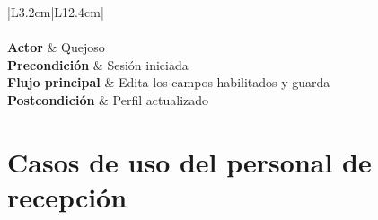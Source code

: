 \begingroup
{}
\small
\renewcommand{\arraystretch}{1.25}
\setlength{\tabcolsep}{4pt}
\begin{longtable}{|L{3.2cm}|L{12.4cm}|}
	\hline
	 \\
	\hline
	\endfirsthead
	\hline
	 \\
	\hline
	\endhead
	\textbf{Actor} & Quejoso \\ \hline
	\textbf{Precondición} & Sesión iniciada \\ \hline
	\textbf{Flujo principal} & Edita los campos habilitados y guarda \\ \hline
	\textbf{Postcondición} & Perfil actualizado \\ \hline
\end{longtable}
\endgroup

\section{Casos de uso del personal de recepción}

